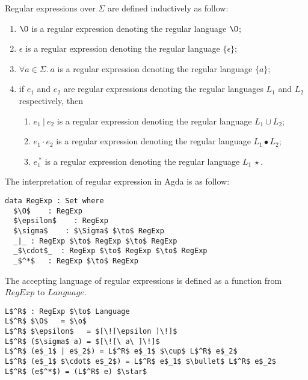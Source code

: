 \begin{defn}
\label{defn:regex}
\noindent Regular expressions over \(\Sigma\) are defined inductively as follow: 
\begin{enumerate}[nolistsep]
  \item \(\O\) is a regular expression denoting the regular language \(\O\);
  \item \(\epsilon\) is a regular expression denoting the regular language \(\{\epsilon\}\);
  \item \(\forall a\in\Sigma.\ a\) is a regular expression denoting the regular language \(\{a\}\);
  \item if \(e_{1}\) and \(e_{2}\) are regular expressions denoting the regular
    languages \(L_1\) and \(L_2\) respectively, then
    \begin{enumerate}[nolistsep]
      \item \(e_{1}\ |\ e_{2}\) is a regular expression denoting the
        regular language \(L_1 \cup L_2\);
      \item \(e_{1}\cdot e_{2}\) is a regular expression denoting the
        regular language \(L_1\bullet L_2\);
      \item \(e_{1}^{\ *}\) is a regular expression denoting the regular
        language \(L_1\ \star\).
     \end{enumerate}
\end{enumerate}
\end{defn}

\par The interpretation of regular expression in Agda is as follow:

\begin{lstlisting}[mathescape=true,xleftmargin=.3\textwidth]
data RegExp : Set where
  $\O$    : RegExp
  $\epsilon$    : RegExp
  $\sigma$    : $\Sigma$ $\to$ RegExp
  _|_ : RegExp $\to$ RegExp $\to$ RegExp
  _$\cdot$_  : RegExp $\to$ RegExp $\to$ RegExp
  _$^*$   : RegExp $\to$ RegExp
\end{lstlisting} 

\par The accepting language of regular expressions is defined as
a function from \(RegExp\) to \(Language\). 

\begin{lstlisting}[mathescape=true,xleftmargin=.3\textwidth]
L$^R$ : RegExp $\to$ Language
L$^R$ $\O$   = $\o$
L$^R$ $\epsilon$   = $[\![\epsilon ]\!]$
L$^R$ ($\sigma$ a) = $[\![\ a\ ]\!]$
L$^R$ (e$_1$ | e$_2$) = L$^R$ e$_1$ $\cup$ L$^R$ e$_2$
L$^R$ (e$_1$ $\cdot$ e$_2$) = L$^R$ e$_1$ $\bullet$ L$^R$ e$_2$
L$^R$ (e$^*$) = (L$^R$ e) $\star$
\end{lstlisting} 